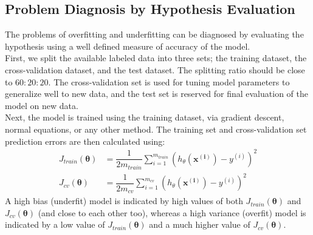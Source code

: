 \documentclass[a4paper, 12pt]{article}
\begin{document}
\subsection{Problem Diagnosis by Hypothesis Evaluation}
The problems of overfitting and underfitting can be diagnosed by evaluating the hypothesis using a well defined measure of accuracy of the model. \\
\break
First, we split the available labeled data into three sets; the training dataset, the cross-validation dataset, and the test dataset. The splitting ratio should be close to $60:20:20$. The cross-validation set is used for tuning model parameters to generalize well to new data, and the test set is reserved for final evaluation of the model on new data. \\
\break
Next, the model is trained using the training dataset, via gradient descent, normal equations, or any other method. The training set and cross-validation set prediction errors are then calculated using:
\begin{align*}
J_{train}\left(\bm{\theta}\right) &= \dfrac{1}{2m_{train}}\sum_{i=1}^{m_{train}}\left(h_{\theta}\left(\bm{x^{\left(i\right)}}\right)-y^{\left(i\right)}\right)^2 \\
J_{cv}\left(\bm{\theta}\right) &= \dfrac{1}{2m_{cv}}\sum_{i=1}^{m_{cv}}\left(h_{\theta}\left(\bm{x^{\left(i\right)}}\right)-y^{\left(i\right)}\right)^2
\end{align*}
A high bias (underfit) model is indicated by high values of both $J_{train}\left(\bm{\theta}\right)$ and $J_{cv}\left(\bm{\theta}\right)$ (and close to each other too), whereas a high variance (overfit) model is indicated by a low value of $J_{train}\left(\bm{\theta}\right)$ and a much higher value of $J_{cv}\left(\bm{\theta}\right)$.
\end{document}
